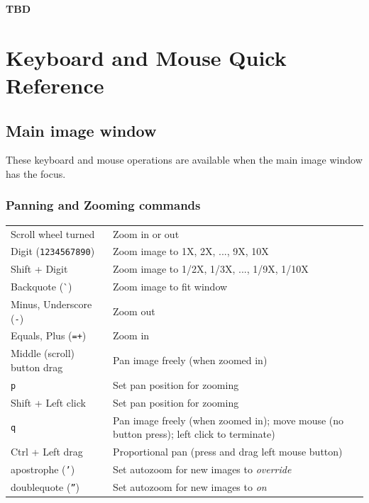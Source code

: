 \documentclass[11pt]{report}
\begin{document}
\bf{TBD}

\appendix    %

\chapter{Keyboard and Mouse Quick Reference}
\label{app:mousekbdref}

\section{Main image window}
These keyboard and mouse operations are available when the main image
window has the focus.

\subsection{Panning and Zooming commands}
\begin{tabularx}{\textwidth}{lX}
Scroll wheel turned & Zoom in or out \\
Digit ({\tt 1234567890}) & Zoom image to 1X, 2X, ..., 9X, 10X \\
Shift + Digit & Zoom image to 1/2X, 1/3X, ..., 1/9X, 1/10X \\
Backquote (\`{}) & Zoom image to fit window \\
Minus, Underscore ({\tt -\textunderscore{}}) & Zoom out \\
Equals, Plus ({\tt =+}) & Zoom in \\
Middle (scroll) button drag & Pan image freely (when zoomed in) \\
{\tt p} & Set pan position for zooming \\
Shift + Left click & Set pan position for zooming \\
{\tt q} & Pan image freely (when zoomed in); move mouse (no button press); left click to terminate) \\
Ctrl + Left drag & Proportional pan (press and drag left mouse button) \\
apostrophe ({\tt '}) & Set autozoom for new images to {\em override} \\
doublequote ({\tt ''}) & Set autozoom for new images to {\em on} \\
\end{tabularx}
\end{document}
